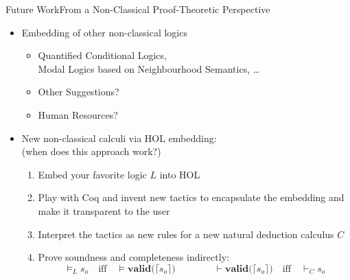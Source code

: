 \newcommand\hol[1]{\boldsymbol{#1}}
\newcommand\lift[1]{\lceil #1 \rceil}
\newcommand\llift[1]{\dot{#1}}

\begin{frame}{Future Work}{From a Non-Classical Proof-Theoretic Perspective} \large

\begin{itemize}
\item Embedding of other non-classical logics
\begin{itemize}
\item Quantified Conditional Logics, \\
      Modal Logics based on Neighbourhood Semantics, \ldots
\pause
\item Other Suggestions?
\pause
\item Human Resources?
\end{itemize}

\pause

\item New non-classical calculi via HOL embedding: \\
(when does this approach work?)
\pause
\begin{enumerate}
  \item Embed your favorite logic $L$ into HOL
  \pause
  \item Play with Coq and invent new tactics to encapsulate the embedding and make it transparent to the user
  \pause
  \item Interpret the tactics as new rules for a new natural deduction calculus $C$
  \pause
  \item Prove soundness and completeness indirectly: \\
  \[
  \models_L s_o \quad \text{iff} \quad \hol{\models} \hol{\textrm{valid}(}\lceil s_o \rceil\hol{)}
  \qquad\qquad
  \hol{\vdash} \hol{\textrm{valid}(}\lceil s_o \rceil\hol{)} \quad \text{iff} \quad \vdash_C s_o
  \]

\end{enumerate}





\end{itemize}
\end{frame}


